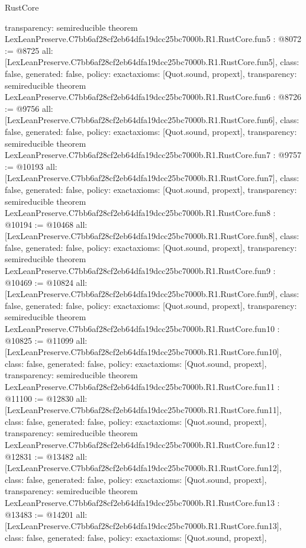 \begin{lexlean}{RustCore}
\begin{coremodule}
{  transparency: semireducible
}
theorem LexLeanPreserve.C7bb6af28cf2eb64dfa19dcc25bc7000b.R1.RustCore.fun5 : @8072 := @8725 {
  all: [LexLeanPreserve.C7bb6af28cf2eb64dfa19dcc25bc7000b.R1.RustCore.fun5],
  class: false,
  generated: false,
  policy: exact{axioms: [Quot.sound, propext]},
  transparency: semireducible
}
theorem LexLeanPreserve.C7bb6af28cf2eb64dfa19dcc25bc7000b.R1.RustCore.fun6 : @8726 := @9756 {
  all: [LexLeanPreserve.C7bb6af28cf2eb64dfa19dcc25bc7000b.R1.RustCore.fun6],
  class: false,
  generated: false,
  policy: exact{axioms: [Quot.sound, propext]},
  transparency: semireducible
}
theorem LexLeanPreserve.C7bb6af28cf2eb64dfa19dcc25bc7000b.R1.RustCore.fun7 : @9757 := @10193 {
  all: [LexLeanPreserve.C7bb6af28cf2eb64dfa19dcc25bc7000b.R1.RustCore.fun7],
  class: false,
  generated: false,
  policy: exact{axioms: [Quot.sound, propext]},
  transparency: semireducible
}
theorem LexLeanPreserve.C7bb6af28cf2eb64dfa19dcc25bc7000b.R1.RustCore.fun8 : @10194 := @10468 {
  all: [LexLeanPreserve.C7bb6af28cf2eb64dfa19dcc25bc7000b.R1.RustCore.fun8],
  class: false,
  generated: false,
  policy: exact{axioms: [Quot.sound, propext]},
  transparency: semireducible
}
theorem LexLeanPreserve.C7bb6af28cf2eb64dfa19dcc25bc7000b.R1.RustCore.fun9 : @10469 := @10824 {
  all: [LexLeanPreserve.C7bb6af28cf2eb64dfa19dcc25bc7000b.R1.RustCore.fun9],
  class: false,
  generated: false,
  policy: exact{axioms: [Quot.sound, propext]},
  transparency: semireducible
}
theorem LexLeanPreserve.C7bb6af28cf2eb64dfa19dcc25bc7000b.R1.RustCore.fun10 : @10825 := @11099 {
  all: [LexLeanPreserve.C7bb6af28cf2eb64dfa19dcc25bc7000b.R1.RustCore.fun10],
  class: false,
  generated: false,
  policy: exact{axioms: [Quot.sound, propext]},
  transparency: semireducible
}
theorem LexLeanPreserve.C7bb6af28cf2eb64dfa19dcc25bc7000b.R1.RustCore.fun11 : @11100 := @12830 {
  all: [LexLeanPreserve.C7bb6af28cf2eb64dfa19dcc25bc7000b.R1.RustCore.fun11],
  class: false,
  generated: false,
  policy: exact{axioms: [Quot.sound, propext]},
  transparency: semireducible
}
theorem LexLeanPreserve.C7bb6af28cf2eb64dfa19dcc25bc7000b.R1.RustCore.fun12 : @12831 := @13482 {
  all: [LexLeanPreserve.C7bb6af28cf2eb64dfa19dcc25bc7000b.R1.RustCore.fun12],
  class: false,
  generated: false,
  policy: exact{axioms: [Quot.sound, propext]},
  transparency: semireducible
}
theorem LexLeanPreserve.C7bb6af28cf2eb64dfa19dcc25bc7000b.R1.RustCore.fun13 : @13483 := @14201 {
  all: [LexLeanPreserve.C7bb6af28cf2eb64dfa19dcc25bc7000b.R1.RustCore.fun13],
  class: false,
  generated: false,
  policy: exact{axioms: [Quot.sound, propext]},
}
\end{coremodule}
\end{lexlean}
